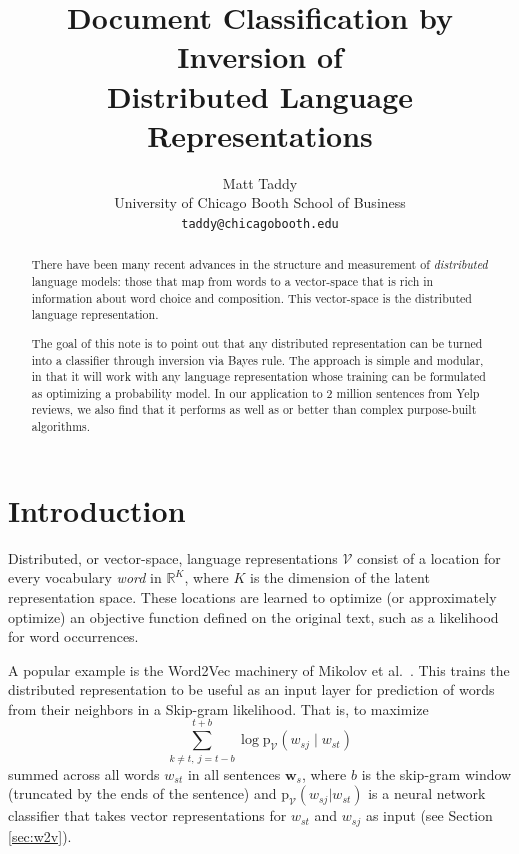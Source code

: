 \documentclass[11pt]{article}
\title{Document Classification by Inversion of \\Distributed Language Representations}
\author{Matt Taddy \\
  University of Chicago Booth School of Business \\
  {\tt taddy@chicagobooth.edu} \\}
\date{}
\begin{document}
\maketitle
\begin{abstract}
There have been many recent advances in the structure and measurement of {\it distributed} language models: those that map from words to a vector-space that is rich in information about word choice and composition.  This vector-space is the distributed language representation.    

The goal of this note is to point out that any distributed  representation can be turned into a classifier through inversion via Bayes rule.  
The approach is simple and modular, in that it will work with any language representation whose training can be formulated as optimizing a probability model. In our application to 2 million sentences from Yelp reviews, we also find that it performs as well as or better than  complex purpose-built algorithms. \end{abstract}

\section{Introduction}

Distributed, or vector-space, language representations $\mathcal{V}$ consist
of a location for every vocabulary {\it word} in $\mathds{R}^K$, where $K$ is
the dimension of the latent representation space.  These locations are learned
to optimize (or approximately optimize) an objective function defined on the
original text, such as a likelihood for word occurrences.

A popular example is the Word2Vec machinery of
Mikolov et al.~.  This trains the distributed
representation to be useful as an input layer for prediction of words from
their neighbors in a Skip-gram likelihood.  That is, to maximize
\begin{equation}\label{eq:skipgram}
\sum_{k\neq t,~j=t-b}^{t+b} \log\mathrm{p}_{\mathcal{V}}(w_{sj}\mid w_{st})
\end{equation}
summed across all words $w_{st}$ in all sentences $\mathbf{w}_s$, where $b$ is
the skip-gram window (truncated by the ends of the
sentence) and  $\mathrm{p}_{\mathcal{V}}(w_{sj}| w_{st})$ is a neural network
classifier that takes vector representations for $w_{st}$ and $w_{sj}$
as input (see Section \ref{sec:w2v}).
\end{document}
